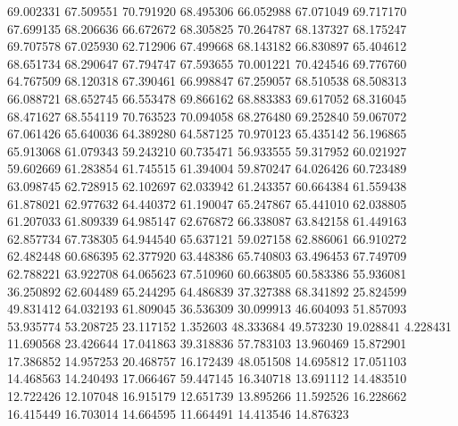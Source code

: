 69.002331
67.509551
70.791920
68.495306
66.052988
67.071049
69.717170
67.699135
68.206636
66.672672
68.305825
70.264787
68.137327
68.175247
69.707578
67.025930
62.712906
67.499668
68.143182
66.830897
65.404612
68.651734
68.290647
67.794747
67.593655
70.001221
70.424546
69.776760
64.767509
68.120318
67.390461
66.998847
67.259057
68.510538
68.508313
66.088721
68.652745
66.553478
69.866162
68.883383
69.617052
68.316045
68.471627
68.554119
70.763523
70.094058
68.276480
69.252840
59.067072
67.061426
65.640036
64.389280
64.587125
70.970123
65.435142
56.196865
65.913068
61.079343
59.243210
60.735471
56.933555
59.317952
60.021927
59.602669
61.283854
61.745515
61.394004
59.870247
64.026426
60.723489
63.098745
62.728915
62.102697
62.033942
61.243357
60.664384
61.559438
61.878021
62.977632
64.440372
61.190047
65.247867
65.441010
62.038805
61.207033
61.809339
64.985147
62.676872
66.338087
63.842158
61.449163
62.857734
67.738305
64.944540
65.637121
59.027158
62.886061
66.910272
62.482448
60.686395
62.377920
63.448386
65.740803
63.496453
67.749709
62.788221
63.922708
64.065623
67.510960
60.663805
60.583386
55.936081
36.250892
62.604489
65.244295
64.486839
37.327388
68.341892
25.824599
49.831412
64.032193
61.809045
36.536309
30.099913
46.604093
51.857093
53.935774
53.208725
23.117152
1.352603
48.333684
49.573230
19.028841
4.228431
11.690568
23.426644
17.041863
39.318836
57.783103
13.960469
15.872901
17.386852
14.957253
20.468757
16.172439
48.051508
14.695812
17.051103
14.468563
14.240493
17.066467
59.447145
16.340718
13.691112
14.483510
12.722426
12.107048
16.915179
12.651739
13.895266
11.592526
16.228662
16.415449
16.703014
14.664595
11.664491
14.413546
14.876323
